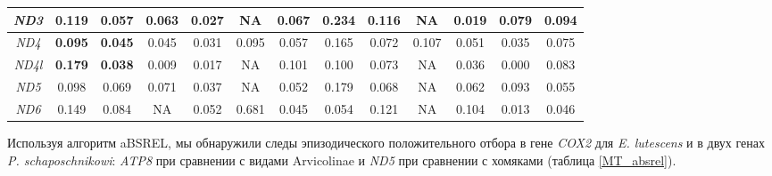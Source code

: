 \begin{landscape}
\begin{table}[]
\begin{tabular}{|c|c|c|c|c|c|c|c|c|c|c|c|c|}
			\textit{ND3} & 0.119 & 0.057 & 0.063 & 0.027 & NA & 0.067 & 0.234 & 0.116 & NA & 0.019 & 0.079& 0.094 \\ \hline
			\textit{ND4} & \textbf{0.095} & \textbf{0.045} & 0.045 & 0.031 & 0.095 & 0.057 & 0.165 & 0.072 & 0.107 & 0.051 & 0.035& 0.075 \\ \hline
			\textit{ND4l} & \textbf{0.179} & \textbf{0.038} & 0.009 & 0.017 & NA & 0.101 & 0.100 & 0.073 & NA & 0.036 & 0.000& 0.083 \\ \hline
			{\textit{ND5}} & 0.098 & 0.069 & 0.071 & 0.037 & NA & 0.052 & 0.179 & 0.068 & NA & 0.062 & 0.093& 0.055 \\ \hline
			\textit{ND6} & 0.149 & 0.084 & NA & 0.052 & 0.681 & 0.045 & 0.054 & 0.121 & NA & 0.104 & 0.013& 0.046 \\ \hline
			
		\end{tabular}
	\end{table}

\end{landscape}

Используя алгоритм aBSREL, мы обнаружили следы эпизодического положительного отбора в гене \textit{COX2} для \textit{E. lutescens} и в двух генах \textit{P. schaposchnikowi}: \textit{ATP8} при сравнении с видами Arvicolinae и \textit{ND5} при сравнении с хомяками (таблица \ref{MT_absrel}).

